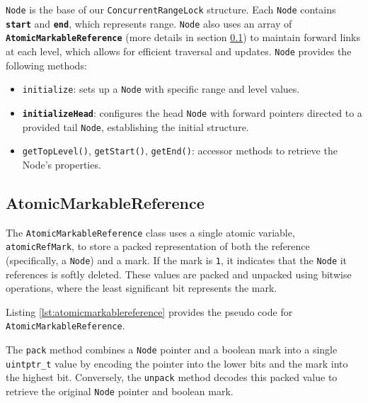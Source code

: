 \texttt{Node} is the base of our \texttt{ConcurrentRangeLock} structure.
Each \texttt{Node} contains \textbf{\texttt{start}} and \textbf{\texttt{end}}, which represents range.
\texttt{Node} also uses an array of \textbf{\texttt{AtomicMarkableReference}} (more details in section \ref{subsec:atomicmarkablereference}) to maintain forward links at each level, which allows for efficient traversal and updates.
\texttt{Node} provides the following methods:

\begin{itemize}
    \item \texttt{initialize}: sets up a \texttt{Node} with specific range and level values.
    \item \textbf{\texttt{initializeHead}}: configures the head \texttt{Node} with forward pointers directed to a provided tail \texttt{Node}, establishing the initial structure.
    \item \texttt{getTopLevel()}, \texttt{getStart()}, \texttt{getEnd()}: accessor methods to retrieve the Node's properties.
\end{itemize}

\begin{figure}[h]
    \centering
    
\end{figure}

\clearpage

\subsection{AtomicMarkableReference} \label{subsec:atomicmarkablereference}

The \texttt{AtomicMarkableReference} class uses a single atomic variable, \texttt{atomicRefMark}, to store a packed representation of both the reference (specifically, a \texttt{Node}) and a mark. If the mark is \texttt{1}, it indicates that the \texttt{Node} it references is softly deleted. These values are packed and unpacked using bitwise operations, where the least significant bit represents the mark.

Listing \ref{lst:atomicmarkablereference} provides the pseudo code for \texttt{AtomicMarkableReference}.

The \texttt{pack} method combines a \texttt{Node} pointer and a boolean mark into a single \texttt{uintptr\_t} value by encoding the pointer into the lower bits and the mark into the highest bit. Conversely, the \texttt{unpack} method decodes this packed value to retrieve the original \texttt{Node} pointer and boolean mark.

